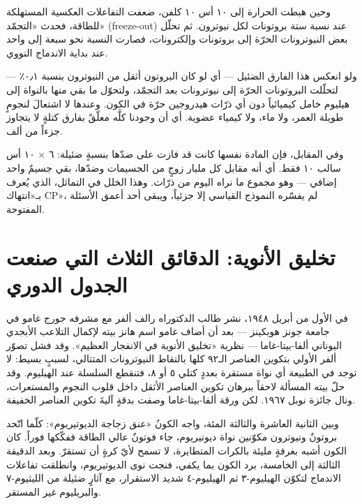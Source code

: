 \documentclass[12pt,a4paper,openany]{book}
\begin{document}
وحين هبطت الحرارة إلى ١٠ أس ١٠ كلفن، ضعفت التفاعلات العكسية المستهلكة للطاقة، فحدث «التجمّد» (freeze-out) عند نسبة ستة بروتونات لكل نيوترون. ثم تحلّل بعض النيوترونات الحرّة إلى بروتونات وإلكترونات، فصارت النسبة نحو سبعة إلى واحد عند بداية الاندماج النووي.


ولو انعكس هذا الفارق الضئيل — أي لو كان البروتون أثقل من النيوترون بنسبة ٠٫١٪ — لتحلّلت البروتونات الحرّة إلى نيوترونات بعد التجمّد، ولتحوّل ما بقي منها بالنواة إلى هيليوم خامل كيميائياً دون أي ذرّات هيدروجين حرّة في الكون. وعندها لا اشتعالَ لنجومٍ طويلة العمر، ولا ماء، ولا كيمياء عضوية. أي أن وجودنا كلَّه معلّقٌ بفارق كتلةٍ لا يتجاوز جزءاً من ألف.


وفي المقابل، فإن المادة نفسها كانت قد فازت على ضدّها بنسبةٍ ضئيلة: ٦ × ١٠ أس سالب ١٠ فقط. أي أنه مقابل كل مليار زوجٍ من الجسيمات وضدّها، بقي جسيمٌ واحد إضافي — وهو مجموع ما نراه اليوم من ذرّات. وهذا الخلل في التماثل، الذي يُعرف بـ«انتهاك CP»، لم يفسّره النموذج القياسي إلا جزئياً، ويبقى أحد أعمق الأسئلة المفتوحة.


\chapter*{تخليق الأنوية: الدقائق الثلاث التي صنعت الجدول الدوري}




في الأول من أبريل ١٩٤٨، نشر طالب الدكتوراه رالف ألفر مع مشرفه جورج غامو في جامعة جونز هوبكينز — بعد أن أضاف غامو اسم هانز بيته لإكمال التلاعب الأبجدي اليوناني ألفا-بيتا-غاما — نظرية «تخليق الأنوية في الانفجار العظيم». وقد فشل تصوّر ألفر الأولي بتكوين العناصر الـ٩٢ كلها بالتقاط النيوترونات المتتالي، لسببٍ بسيط: لا توجد في الطبيعة أي نواة مستقرة بعددٍ كتلي ٥ أو ٨، فتنقطع السلسلة عند الهيليوم. وقد حلّ بيته المسألة لاحقاً ببرهان تكوين العناصر الأثقل داخل قلوب النجوم والمستعرات، ونال جائزة نوبل ١٩٦٧. لكن ورقة ألفا-بيتا-غاما وصفت بدقةٍ آليةَ تكوين العناصر الخفيفة.


وبين الثانية العاشرة والثالثة المئة، واجه الكونُ «عنق زجاجة الديوتيريوم»: كلّما اتّحد بروتونٌ ونيوترون مكوّنين نواة ديوتيريوم، جاء فوتونٌ عالي الطاقة ففكّكها فوراً. كان الكون أشبه بغرفةٍ مليئة بالكرات المتطايرة، لا تسمح لأيّ كرةٍ أن تستقرّ. وبعد الدقيقة الثالثة إلى الخامسة، برد الكون بما يكفي، فنجت نوى الديوتيريوم، وانطلقت تفاعلات الاندماج لتكوّن الهيليوم-٣ ثم الهيليوم-٤ شديد الاستقرار، مع آثارٍ ضئيلة من الليثيوم-٧ والبريليوم غير المستقر.
\end{document}
